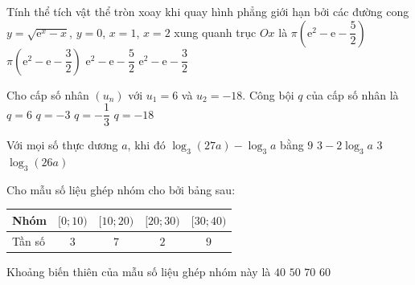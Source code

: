 \caulc
\begin{ex}%
	Tính thể tích vật thể tròn xoay khi quay hình phẳng giới hạn bởi các đường cong $y=\sqrt{\mathrm{e}^{x}-x}$, $y=0$, $x=1$, $x=2$ xung quanh trục $Ox$ là
	\choice
	{$\pi(\mathrm{e}^{2}-\mathrm{e}-\dfrac{5}{2})$}
	{\True $\pi(\mathrm{e}^{2}-\mathrm{e}-\dfrac{3}{2})$}
	{$\mathrm{e}^{2}-\mathrm{e}-\dfrac{5}{2}$}
	{$\mathrm{e}^{2}-\mathrm{e}-\dfrac{3}{2}$}
\end{ex}

\begin{ex}%
	Cho cấp số nhân $(u_{n})$ với $u_{1}=6$ và $u_{2}=-18$. Công bội $q$ của cấp số nhân là
	\choice
	{$q=6$}
	{\True $q=-3$}
	{$q=-\dfrac{1}{3}$}
	{$q=-18$}
\end{ex}

\begin{ex}%
	Với mọi số thực dương $a$, khi đó $\log_{3}(27a)-\log_{3}a$ bằng
	\choice
	{$9$}
	{$3-2\log_{3}a$}
	{\True $3$}
	{$\log_{3}(26a)$}
\end{ex}

\begin{ex}%
	Cho mẫu số liệu ghép nhóm cho bởi bảng sau:
	\begin{center}
		\begin{tabular}{|l|c|c|c|c|}
			\hline
			Nhóm & $[0;10)$ & $[10;20)$ & $[20;30)$ & $[30;40)$ \\
			\hline
			Tần số & $3$ & $7$ & $2$ & $9$ \\
			\hline
		\end{tabular}
	\end{center}
	Khoảng biến thiên của mẫu số liệu ghép nhóm này là
	\choice
	{\True $40$}
	{$50$}
	{$70$}
	{$60$}
\end{ex}


